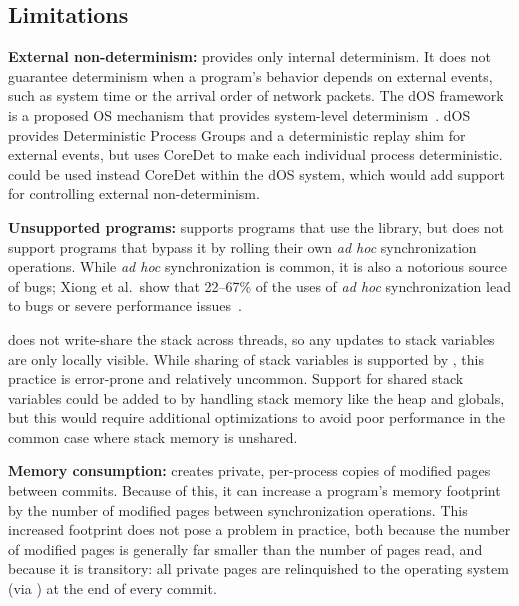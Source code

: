 \subsection{Limitations}
\label{sec:limitations}

\textbf{External non-determinism:} \dthreads{} provides only internal
determinism. It does not guarantee determinism when a program's behavior depends
on external events, such as system time or the arrival order of network packets.
 The dOS framework is a proposed OS mechanism that provides system-level
determinism~\cite{deterministic-process-groups}.  dOS provides Deterministic Process Groups and a deterministic replay shim for external events, but uses CoreDet to make each individual process deterministic.  \dthreads{} could be used instead CoreDet within the dOS system, which would add support for controlling external non-determinism.

\textbf{Unsupported programs:} \dthreads{} supports programs that use the
\pthreads{} library, but does not support programs that bypass it by
rolling their own \emph{ad hoc} synchronization operations. While
\emph{ad hoc} synchronization is common, it is also a notorious source of bugs;
Xiong et al.\ show that 22--67\% of the uses of \emph{ad hoc} synchronization
lead to bugs or severe performance issues~\cite{ad-hoc-considered-harmful}.


\dthreads{} does not write-share the stack across threads, so any updates to
stack variables are only locally visible.  While sharing of stack variables is
supported by \pthreads{}, this practice is error-prone and relatively
uncommon.  Support for shared stack variables could be added to \dthreads{} by handling stack memory like the heap and globals, but this would require additional optimizations to avoid poor performance in the common case where stack memory is unshared.

\textbf{Memory consumption:} \dthreads{} creates private, per-process
copies of modified pages between commits.  Because of this, it can increase a program's memory
footprint by the number of modified pages between synchronization operations.
This increased footprint does not pose a problem in practice, both because the
number of modified pages is generally far smaller than the number of pages read,
and because it is transitory: all private pages are relinquished to the
operating system (via \madvise{}) at the end of every commit.

